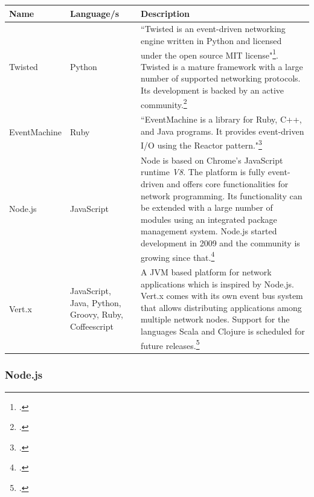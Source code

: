 \begin{savenotes} %
\begin{table}[h]
\centering
\begin{tabular*}{\textwidth}{p{} p{} p{}}
\toprule
\textbf{Name} & \textbf{Language/s} & \textbf{Description} \\
\midrule 
Twisted			& Python			& ``Twisted is an event-driven networking engine written in 
									  Python and licensed under the open source MIT license"\footcite[Cf.][]{Twisted_2012}.
									  Twisted is a mature framework with a large number of supported networking
									  protocols. Its development is backed by an active
									  community.\footcite[Cf.][12]{fettig_2005}
									  \\
									  
EventMachine 	& Ruby    			& ``EventMachine is a library for Ruby, C++, and Java
									  programs. It provides event-driven I/O using the Reactor 
									  pattern."\footcite[][]{eventmachine_2012}\\

Node.js			& JavaScript		& Node is based on Chrome's JavaScript runtime \textit{V8}.
									  The platform is fully event-driven and offers core
									  functionalities for network programming. Its functionality
									  can be extended with a large number of modules using an
									  integrated package management system.
									  Node.js started development in 2009 and the community
									  is growing since that.\footcite[Cf.][]{Mashtable_2011}\\
									  
Vert.x			& JavaScript, Java, Python, Groovy, Ruby, Coffeescript		
									& A JVM based platform for network applications which is
									  inspired by Node.js. Vert.x comes with its own event
									  bus system that allows distributing applications
									  among multiple network nodes. Support for the languages
									  Scala and Clojure is scheduled for future releases.\footcite[Cf.][]{vertx_2012}\\
\bottomrule 
\end{tabular*}
  \label{tab:existing_frameworks}
\end{table}
\end{savenotes}



\subsubsection{Node.js}
\label{node.js}

